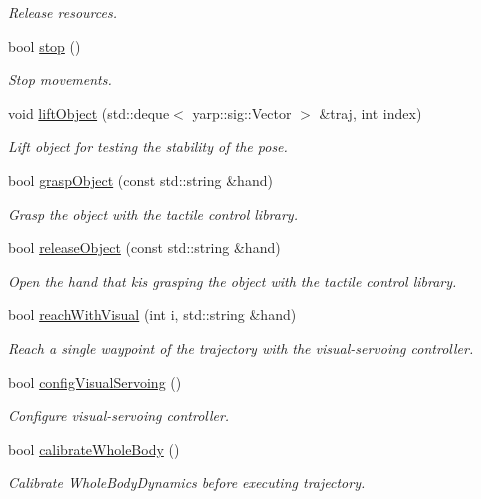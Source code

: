 \begin{DoxyCompactItemize}
\begin{DoxyCompactList}\small\item\em Release resources. \end{DoxyCompactList}\item 
bool \hyperlink{classGraspExecution_a4a81d173be82654388313b9a89c16457}{stop} ()\label{classGraspExecution_a4a81d173be82654388313b9a89c16457}

\begin{DoxyCompactList}\small\item\em Stop movements. \end{DoxyCompactList}\item 
void \hyperlink{classGraspExecution_aeb93a25964087a22a2580f251fed7e80}{lift\+Object} (std\+::deque$<$ yarp\+::sig\+::\+Vector $>$ \&traj, int index)
\begin{DoxyCompactList}\small\item\em Lift object for testing the stability of the pose. \end{DoxyCompactList}\item 
bool \hyperlink{classGraspExecution_af02296b437dec003626a448d399bba33}{grasp\+Object} (const std\+::string \&hand)
\begin{DoxyCompactList}\small\item\em Grasp the object with the tactile control library. \end{DoxyCompactList}\item 
bool \hyperlink{classGraspExecution_aa7cce148b98247a05f03c8ed31f1cb25}{release\+Object} (const std\+::string \&hand)
\begin{DoxyCompactList}\small\item\em Open the hand that kis grasping the object with the tactile control library. \end{DoxyCompactList}\item 
bool \hyperlink{classGraspExecution_acc01cbdd4c863136429951f46ddb951b}{reach\+With\+Visual} (int i, std\+::string \&hand)
\begin{DoxyCompactList}\small\item\em Reach a single waypoint of the trajectory with the visual-\/servoing controller. \end{DoxyCompactList}\item 
bool \hyperlink{classGraspExecution_a4f653b86f2bcc84b92ce592f54cdf73d}{config\+Visual\+Servoing} ()
\begin{DoxyCompactList}\small\item\em Configure visual-\/servoing controller. \end{DoxyCompactList}\item 
bool \hyperlink{classGraspExecution_a5989db8e41aadd63d7ba60b551de04c8}{calibrate\+Whole\+Body} ()
\begin{DoxyCompactList}\small\item\em Calibrate Whole\+Body\+Dynamics before executing trajectory. \end{DoxyCompactList}\end{DoxyCompactItemize}

